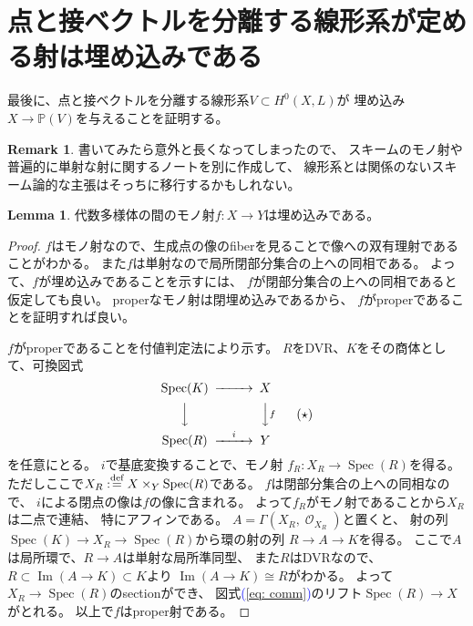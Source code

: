\documentclass[uplatex]{jsarticle}
\renewcommand{\eqref}[1]{\textcolor{blue}{(\ref{#1})}}
\theoremstyle{definition}
\newtheorem{lem}[lem]{Lemma}
\newtheorem{rem}[rem]{Remark}
\DeclareMathOperator{\im}{\mathrm{Im}}
\DeclareMathOperator{\Spec}{\mathrm{Spec}}
\renewcommand{\P}{\mathbb{P}}
\newcommand{\mcO}{\mathcal{O}}
\DeclareMathOperator{\OOO}{\mcO}
\newcommand{\OO}[1]{\OOO_{#1}}
\def\dfn{:\overset{\mbox{{\scriptsize def}}}{=}}
\begin{document}
\section{点と接ベクトルを分離する線形系が定める射は埋め込みである}


最後に、点と接ベクトルを分離する線形系\(V\subset H^0(X,L)\)が
埋め込み\(X\to \P(V)\)を与えることを証明する。

\begin{rem}
  書いてみたら意外と長くなってしまったので、
  スキームのモノ射や普遍的に単射な射に関するノートを別に作成して、
  線形系とは関係のないスキーム論的な主張はそっちに移行するかもしれない。
\end{rem}




\begin{lem}\label{lem: mono var}
  代数多様体の間のモノ射\(f:X\to Y\)は埋め込みである。
\end{lem}


\begin{proof}
  \(f\)はモノ射なので、生成点の像のfiberを見ることで像への双有理射であることがわかる。
  また\(f\)は単射なので局所閉部分集合の上への同相である。
  よって、\(f\)が埋め込みであることを示すには、
  \(f\)が閉部分集合の上への同相であると仮定しても良い。
  properなモノ射は閉埋め込みであるから、
  \(f\)がproperであることを証明すれば良い。

  \(f\)がproperであることを付値判定法により示す。
  \(R\)をDVR、\(K\)をその商体として、可換図式
  \begin{equation}\label{eq: comm}
    \begin{CD}
      \Spec(K) @>>> X \\
      @VVV @VVfV \\
      \Spec(R) @>i>> Y
    \end{CD}
    \tag{\(\star\)}
  \end{equation}
  を任意にとる。
  \(i\)で基底変換することで、モノ射
  \(f_R:X_R\to \Spec(R)\)を得る。
  ただしここで\(X_R\dfn X\times_Y\Spec(R)\)である。
  \(f\)は閉部分集合の上への同相なので、
  \(i\)による閉点の像は\(f\)の像に含まれる。
  よって\(f_R\)がモノ射であることから\(X_R\)は二点で連結、
  特にアフィンである。
  \(A=\Gamma(X_R,\OO{X_R})\)と置くと、
  射の列\(\Spec(K)\to X_R\to \Spec(R)\)から環の射の列
  \(R\to A\to K\)を得る。
  ここで\(A\)は局所環で、\(R\to A\)は単射な局所準同型、
  また\(R\)はDVRなので、\(R\subset \im(A\to K)\subset K\)より
  \(\im(A\to K)\cong R\)がわかる。
  よって\(X_R\to \Spec(R)\)のsectionができ、
  図式\eqref{eq: comm}のリフト\(\Spec(R)\to X\)がとれる。
  以上で\(f\)はproper射である。
\end{proof}
\end{document}
